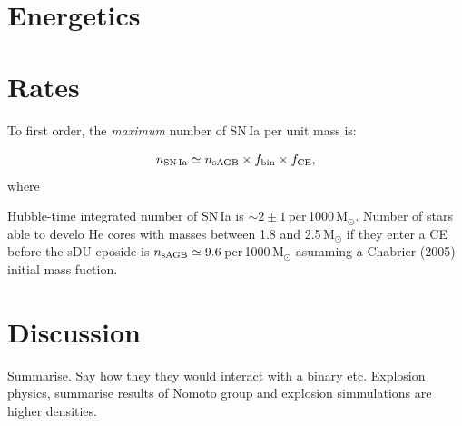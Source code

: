 \documentclass[twocolumn,tighten,times]{aastex62}
\begin{document}
\section{Energetics}

\section{Rates}
To first order, the \emph{maximum} number of SN\,Ia per unit mass is:

\begin{equation}
n_{\rm SN\,Ia} \simeq n_{\rm sAGB}\times f_{\rm bin} \times f_{\rm CE},
\end{equation}
where 


Hubble-time integrated number of SN\,Ia is $\sim 2\pm 1$\,per\,1000\,M$_{\odot}$. 
Number of stars able to develo He cores with masses between 1.8 and 2.5\,M$_{\odot}$ if they enter a CE before the sDU eposide is $n_{\rm sAGB}\simeq 9.6$\,per\,1000\,M$_{\odot}$ asumming a Chabrier (2005) initial mass fuction. 


\section{Discussion}

Summarise. Say how they they would interact with a binary etc. Explosion physics, summarise results of Nomoto group and explosion simmulations are higher densities. 









\end{document}
